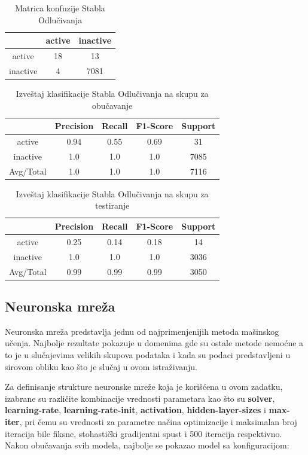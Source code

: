 \documentclass[12pt]{article}
\begin{document}
\begin{table}
\caption{Matrica konfuzije Stabla Odlučivanja}
\centering
\begin{tabular}{|c|c|c|}
        	\hline
	& active & inactive \\
        	\hline
	active & 18 & 13 \\
	\hline
        	inactive & 4 & 7081 \\
	\hline
\end{tabular}
\end{table}

\begin{table}
\caption{Izveštaj klasifikacije Stabla Odlučivanja na skupu za obučavanje}
\centering
\begin{tabular}{|c|c|c|c|c|}
        	\hline
	& Precision & Recall & F1-Score & Support \\
        	\hline
	active & 0.94 & 0.55 & 0.69 & 31 \\
        	\hline
	inactive & 1.0 & 1.0 & 1.0 & 7085 \\
        	\hline
	Avg/Total & 1.0 & 1.0 & 1.0 & 7116 \\
	\hline
\end{tabular}
\end{table}

\begin{table}
\caption{Izveštaj klasifikacije Stabla Odlučivanja na skupu za testiranje}
\centering
\begin{tabular}{|c|c|c|c|c|}
        	\hline
	& Precision & Recall & F1-Score & Support \\
        	\hline
	active & 0.25 & 0.14 & 0.18 & 14 \\
        	\hline
	inactive & 1.0 & 1.0 & 1.0 & 3036 \\
        	\hline
	Avg/Total & 0.99 & 0.99 & 0.99 & 3050 \\
	\hline
\end{tabular}
\end{table}


\newpage
\subsection{Neuronska mreža}
Neuronska mreža predstavlja jednu od najprimenjenijih metoda mašinskog učenja. Najbolje rezultate pokazuje u domenima gde su ostale metode nemoćne a to je u slučajevima velikih skupova podataka i kada su podaci predstavljeni u sirovom obliku kao što je slučaj u ovom istraživanju.

Za definisanje strukture neuronske mreže koja je korišćena u ovom zadatku, izabrane su različite kombinacije vrednosti parametara kao što su  {\bf solver},  {\bf learning-rate},  {\bf learning-rate-init},  {\bf activation},  {\bf hidden-layer-sizes} i  {\bf max-iter}, pri čemu su vrednosti za parametre načina optimizacije i maksimalan broj iteracija bile fiksne, stohastički gradijentni spust i 500 iteracija respektivno. Nakon obučavanja svih modela, najbolje se pokazao model sa konfiguracijom: 
\end{document}
